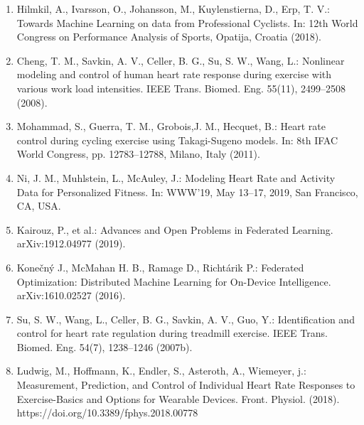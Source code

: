 \documentclass[journal,transmag]{IEEEtran}
\begin{document}
\begin{enumerate}
  \item Hilmkil, A., Ivarsson, O., Johansson, M., Kuylenstierna, D., Erp, T. V.: Towards Machine Learning on data from Professional Cyclists. In: 12th World Congress on Performance Analysis of Sports, Opatija, Croatia (2018).
  \item Cheng, T. M., Savkin, A. V., Celler, B. G., Su, S. W., Wang, L.: Nonlinear modeling and control of human heart rate response during exercise with various work load intensities. IEEE Trans. Biomed. Eng. 55(11), 2499–2508 (2008).
  \item Mohammad, S., Guerra, T. M., Grobois,J. M., Hecquet, B.: Heart rate control during cycling exercise using Takagi-Sugeno models. In: 8th IFAC World Congress, pp. 12783–12788, Milano, Italy (2011).
  \item Ni, J. M., Muhlstein, L., McAuley, J.: Modeling Heart Rate and Activity Data for Personalized Fitness. In: WWW’19, May 13–17, 2019, San Francisco, CA, USA.
  \item  Kairouz, P., et al.: Advances and Open Problems in Federated Learning. arXiv:1912.04977 (2019).
  \item Konečný J., McMahan H. B., Ramage D., Richtárik P.: Federated Optimization: Distributed Machine Learning for On-Device Intelligence. arXiv:1610.02527 (2016).
  \item Su, S. W., Wang, L., Celler, B. G., Savkin, A. V., Guo, Y.: Identification and control for heart rate regulation during treadmill exercise. IEEE Trans. Biomed. Eng. 54(7), 1238–1246 (2007b).
  \item Ludwig, M., Hoffmann, K., Endler, S., Asteroth, A., Wiemeyer, j.: Measurement, Prediction, and Control of Individual Heart Rate Responses to Exercise-Basics and Options for Wearable Devices. Front. Physiol. (2018). https://doi.org/10.3389/fphys.2018.00778
\end{enumerate}
\end{document}
